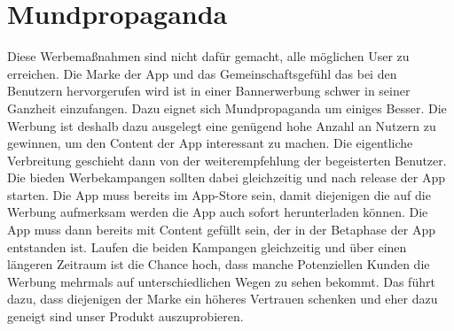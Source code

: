 \section{Mundpropaganda}

Diese Werbemaßnahmen sind nicht dafür gemacht, alle möglichen User zu erreichen. Die Marke der App und das Gemeinschaftsgefühl das bei den Benutzern hervorgerufen wird ist in einer Bannerwerbung schwer in seiner Ganzheit einzufangen. Dazu eignet sich Mundpropaganda um einiges Besser. Die Werbung ist deshalb dazu ausgelegt eine genügend hohe Anzahl an Nutzern zu gewinnen, um den Content der App interessant zu machen. Die eigentliche Verbreitung geschieht dann von der weiterempfehlung der begeisterten Benutzer.
Die bieden Werbekampangen sollten dabei gleichzeitig und nach release der App starten. Die App muss bereits im App-Store sein, damit diejenigen die auf die Werbung aufmerksam werden die App auch sofort herunterladen können. Die App muss dann bereits mit Content gefüllt sein, der in der Betaphase der App entstanden ist. Laufen die beiden Kampangen gleichzeitig und über einen längeren Zeitraum ist die Chance hoch, dass manche Potenziellen Kunden die Werbung mehrmals auf unterschiedlichen Wegen zu sehen bekommt. Das führt dazu, dass diejenigen der Marke ein höheres Vertrauen schenken und eher dazu geneigt sind unser Produkt auszuprobieren.
